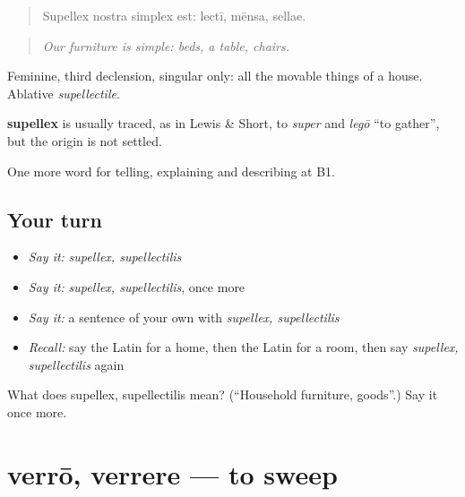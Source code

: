 \begin{quote}
Supellex nostra simplex est: lectī, mēnsa, sellae.
\end{quote}

\begin{quote}
\emph{Our furniture is simple: beds, a table, chairs.}
\end{quote}

Feminine, third declension, singular only: all the movable things of a house. Ablative \emph{supellectile}.

\begin{cousinweb}
\textbf{supellex} is usually traced, as in Lewis \& Short, to \emph{super} and \emph{legō} \textquotedblleft{}to gather\textquotedblright{}, but the origin is not settled.
\end{cousinweb}

\begin{grammarlens}[title={What you've built}]
One more word for telling, explaining and describing at B1.
\end{grammarlens}

\subsection*{Your turn}
\begin{itemize}
\raggedright
  \item \emph{Say it:} \emph{supellex, supellectilis}
  \item \emph{Say it:} \emph{supellex, supellectilis}, once more
  \item \emph{Say it:} a sentence of your own with \emph{supellex, supellectilis}
  \item \emph{Recall:} say the Latin for a home, then the Latin for a room, then say \emph{supellex, supellectilis} again
\end{itemize}

\begin{tcolorbox}[breakable,colback=teal!4,colframe=teal!35!black,title={Before you move on}]
What does supellex, supellectilis mean? (\textquotedblleft{}Household furniture, goods\textquotedblright{}.) Say it once more.
\end{tcolorbox}
\section[verrō, verrere]{verrō, verrere — to sweep}

\label{lesson:LA-C552-verro}




